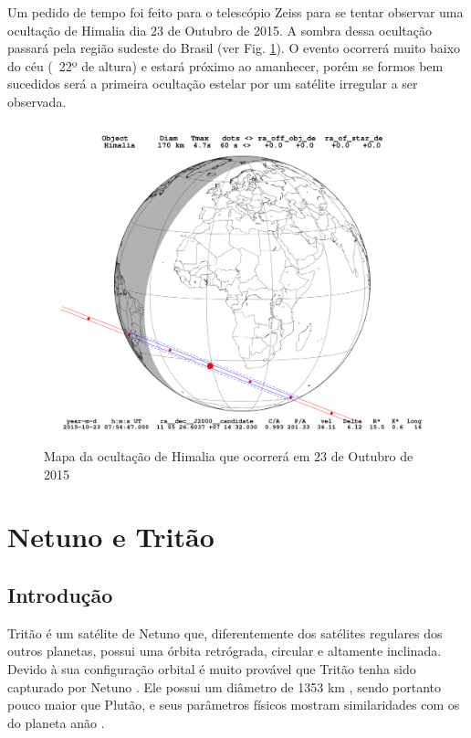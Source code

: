 \documentclass[12pt,a4paper]{monografia}
\begin{document}
Um pedido de tempo foi feito para o telescópio Zeiss para se tentar observar uma ocultação de Himalia  dia 23 de Outubro de 2015. A sombra dessa ocultação passará pela região sudeste do Brasil (ver Fig. \ref{Fig: occ-Himalia-itajuba}). O evento ocorrerá muito baixo do céu (~22º de altura) e estará próximo ao amanhecer, porém se formos bem sucedidos será a primeira ocultação estelar por um satélite irregular a ser observada.

\begin{figure}[h]
\includegraphics[scale=0.35]{figuras/Himalia_2015-10-23T07:54:47.png}
\caption{Mapa da ocultação de Himalia que ocorrerá em 23 de Outubro de 2015}
\label{Fig: occ-Himalia-itajuba}
\end{figure}


\chapter{Netuno e Tritão}
\label{Cap: Netuno-Tritao}

\section{Introdução}
\label{Sec: Netuno-intro}

\indent \indent Tritão é um satélite de Netuno que, diferentemente dos satélites regulares dos outros planetas, possui uma órbita retrógrada, circular e altamente inclinada. Devido à sua configuração orbital é muito provável que Tritão tenha sido capturado por Netuno \citep{McKinnon2007}. Ele possui um diâmetro de 1353 km \citep{Thomas2000}, sendo portanto pouco maior que Plutão, e seus parâmetros físicos mostram similaridades com os do planeta anão \citep{Nimmo2015}.
\end{document}
